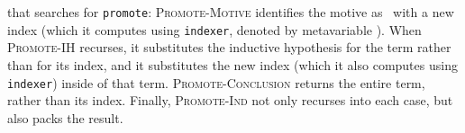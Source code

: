 \iffalse
that searches for \lstinline{promote}:
\textsc{Promote-Motive} identifies the motive 
as \B\ with a new index (which it computes using \lstinline{indexer}, denoted by metavariable \smallmath{$\pi$}).
When \textsc{Promote-IH} recurses, it substitutes the inductive hypothesis for the term rather than
for its index, and it substitutes the new index (which it also computes using \lstinline{indexer}) inside of that term.
\textsc{Promote-Conclusion} returns the entire term, rather than its index.
Finally, \textsc{Promote-Ind} not only recurses into each case, but also packs the result.


